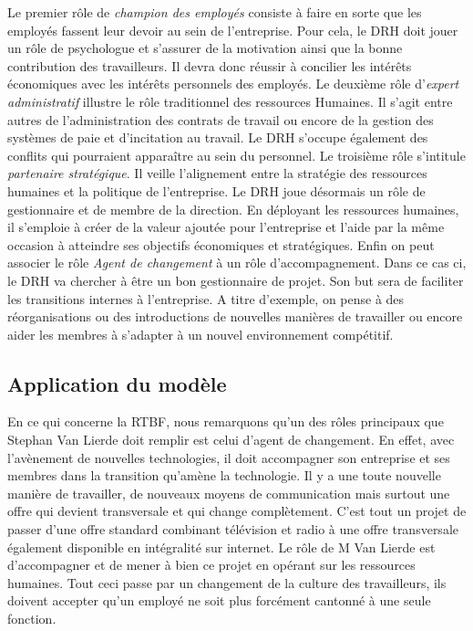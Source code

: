 \documentclass[a4paper, 12pt]{article}
\begin{document}
Le premier rôle de \textit{champion des employés} consiste à faire en sorte que les employés fassent leur devoir au sein de l'entreprise. Pour cela, le DRH doit jouer un rôle de psychologue et s'assurer de la motivation ainsi que la bonne contribution des travailleurs. Il devra donc réussir à concilier les intérêts économiques avec les intérêts personnels des employés.
Le deuxième rôle d'\textit{expert administratif}  illustre le rôle traditionnel des ressources Humaines. Il s'agit entre autres de l'administration des contrats de travail ou encore de la gestion des systèmes de paie et d'incitation au travail. Le DRH s'occupe également des conflits qui pourraient apparaître au sein du personnel.
Le troisième rôle s'intitule \textit{partenaire stratégique}. Il veille l'alignement entre la stratégie des ressources humaines et la politique de l'entreprise. Le DRH joue désormais un rôle de gestionnaire et de membre de la direction. En déployant les ressources humaines, il s'emploie à créer de la valeur ajoutée pour l'entreprise et l'aide par la même occasion à atteindre ses objectifs économiques et stratégiques.
Enfin on peut associer le rôle \textit{Agent de changement} à un rôle d'accompagnement. Dans ce cas ci, le DRH va chercher à être un bon gestionnaire de projet. Son but sera de faciliter les transitions internes à l'entreprise. A titre d'exemple, on pense à des réorganisations ou des introductions de nouvelles manières de travailler ou encore aider les membres à s'adapter à un nouvel environnement compétitif.

\subsection{Application du modèle}
En ce qui concerne la RTBF, nous remarquons qu'un des rôles principaux que Stephan Van Lierde doit remplir est celui d'agent de changement. En effet, avec l'avènement de nouvelles technologies, il doit accompagner son entreprise et ses membres dans la transition qu'amène la technologie. Il y a une toute nouvelle manière de travailler, de nouveaux moyens de communication mais surtout une offre qui devient transversale et qui change complètement. C'est tout un projet de passer d'une offre standard combinant télévision et radio à une offre transversale également disponible en intégralité sur internet. Le rôle de M Van Lierde est d'accompagner et de mener à bien ce projet en opérant sur les ressources humaines. Tout ceci passe par un changement de la culture des travailleurs, ils doivent accepter qu'un employé ne soit plus forcément cantonné à une seule fonction. 
\end{document}
